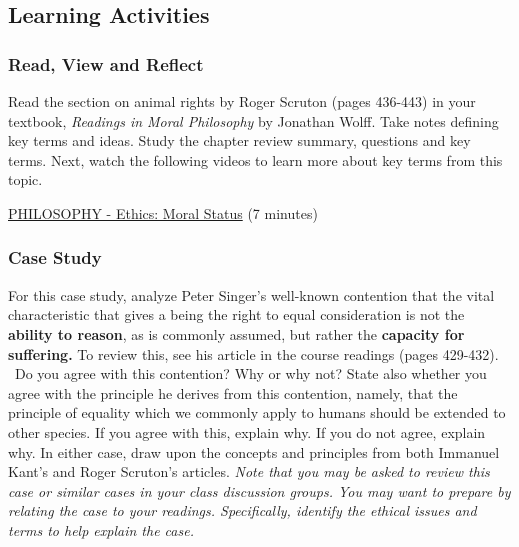 \documentclass[
]{book}
\begin{document}
\hypertarget{learning-activities-18}{%
\subsection*{Learning Activities}\label{learning-activities-18}}

\begin{reflect}
\hypertarget{read-view-and-reflect-23}{%
\subsubsection*{Read, View and Reflect}\label{read-view-and-reflect-23}}

Read the section on animal rights by Roger Scruton (pages 436-443) in your textbook, \emph{Readings in Moral Philosophy} by Jonathan Wolff. Take notes defining key terms and ideas. Study the chapter review summary, questions and key terms.
Next, watch the following videos to learn more about key terms from this topic.

\href{https://www.khanacademy.org/partner-content/wi-phi/wiphi-value-theory/wiphi-ethics/v/moral-status}{PHILOSOPHY - Ethics: Moral Status} (7 minutes)

\hypertarget{case-study}{%
\subsubsection*{Case Study}\label{case-study}}

For this case study, analyze Peter Singer's well-known contention that the vital characteristic that gives a being the right to equal consideration is not the \textbf{ability to reason}, as is commonly assumed, but rather the \textbf{capacity for suffering.} To review this, see his article in the course readings (pages 429-432). ~Do you agree with this contention? Why or why not? State also whether you agree with the principle he derives from this contention, namely, that the principle of equality which we commonly apply to humans should be extended to other species. If you agree with this, explain why. If you do not agree, explain why. In either case, draw upon the concepts and principles from both Immanuel Kant's and Roger Scruton's articles.
\emph{Note that you may be asked to review this case or similar cases in your class discussion groups. You may want to prepare by relating the case to your readings. Specifically, identify the ethical issues and terms to help explain the case.}


\end{reflect}
\end{document}
